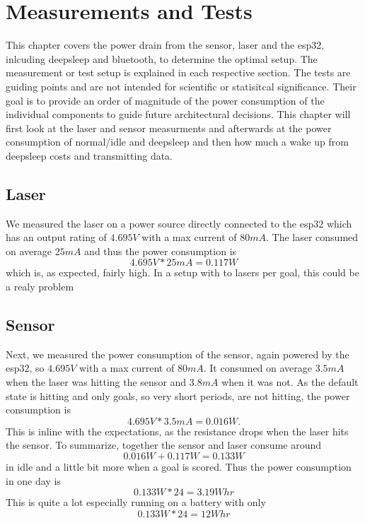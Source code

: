 \section{Measurements and Tests}
This chapter covers the power drain from the sensor, laser and the esp32, inlcuding deepsleep and bluetooth, to determine the optimal setup. The measurement or test setup is explained in each respective section. The tests are guiding points and are not intended for scientific or statisitcal significance. Their goal is to provide an order of magnitude of the power consumption of the individual components to guide future architectural decisions. This chapter will first look at the laser and sensor measurments and afterwards at the power consumption of normal/idle and deepsleep and then how much a wake up from deepsleep costs and transmitting data.


\subsection{Laser}
We measured the laser on a power source directly connected to the esp32 which has an output rating of $4.695V$ with a max current of $80mA$. The laser consumed on average $25mA$ and thus the power consumption is
\begin{equation*}
    4.695V * 25mA = 0.117W
\end{equation*}
which is, as expected, fairly high. In a setup with to lasers per goal, this could be a realy problem


\subsection{Sensor}
Next, we measured the power consumption of the sensor, again powered by the esp32, so $4.695V$ with a max current of $80mA$. It consumed on average $3.5mA$ when the laser was hitting the sensor and $3.8mA$ when it was not. As the default state is hitting and only goals, so very short periods, are not hitting, the power consumption is
  \begin{equation*}
      4.695V * 3.5mA = 0.016W.
    \end{equation*}
This is inline with the expectations, as the resistance drops when the laser hits the sensor. 
To summarize, together the sensor and laser consume around  
\begin{equation*}
    0.016W + 0.117W = 0.133W
  \end{equation*}
in idle and a little bit more when a goal is scored. Thus the power consumption in one day is
\begin{equation*}
    0.133W * 24 = 3.19Whr
\end{equation*}
This is quite a lot especially running on a battery with only
\begin{equation*}
    0.133W * 24 = 12Whr
\end{equation*}

